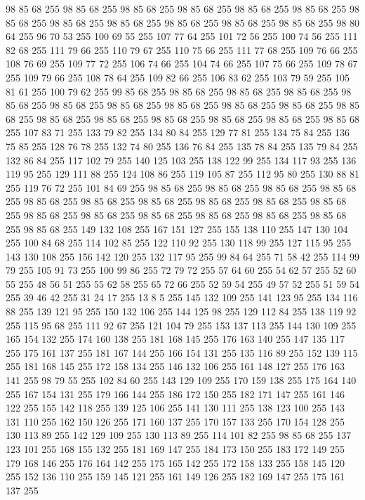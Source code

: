 98 85 68 255 98 85 68 255 98 85 68 255 98 85 68 255 98 85 68 255 98 85 68 255 98 85 68 255 98 85 68 255 98 85 68 255 98 85 68 255 98 85 68 255 98 85 68 255 98 80 64 255 96 70 53 255 100 69 55 255 107 77 64 255 101 72 56 255 100 74 56 255 111 82 68 255 111 79 66 255 110 79 67 255 110 75 66 255 111 77 68 255 109 76 66 255 108 76 69 255 109 77 72 255 106 74 66 255 104 74 66 255 107 75 66 255 109 78 67 255 109 79 66 255 108 78 64 255 109 82 66 255 106 83 62 255 103 79 59 255 105 81 61 255 100 79 62 255 99 85 68 255 98 85 68 255 98 85 68 255 98 85 68 255 98 85 68 255 98 85 68 255 98 85 68 255 98 85 68 255 98 85 68 255 98 85 68 255 98 85 68 255 98 85 68 255 98 85 68 255 98 85 68 255 98 85 68 255 98 85 68 255 98 85 68 255 107 83 71 255 133 79 82 255 134 80 84 255 129 77 81 255 134 75 84 255 136 75 85 255 128 76 78 255 132 74 80 255 136 76 84 255 135 78 84 255
135 79 84 255 132 86 84 255 117 102 79 255 140 125 103 255 138 122 99 255 134 117 93 255 136 119 95 255 129 111 88 255 124 108 86 255 119 105 87 255 112 95 80 255 130 88 81 255 119 76 72 255 101 84 69 255 98 85 68 255 98 85 68 255 98 85 68 255 98 85 68 255 98 85 68 255 98 85 68 255 98 85 68 255 98 85 68 255 98 85 68 255 98 85 68 255 98 85 68 255 98 85 68 255 98 85 68 255 98 85 68 255 98 85 68 255 98 85 68 255 98 85 68 255 149 132 108 255 167 151 127 255 155 138 110 255 147 130 104 255 100 84 68 255 114 102 85 255 122 110 92 255 130 118 99 255 127 115 95 255 143 130 108 255 156 142 120 255 132 117 95 255 99 84 64 255 71 58 42 255 114 99 79 255 105 91 73 255 100 99 86 255 72 79 72 255 57 64 60 255 54 62 57 255 52 60 55 255 48 56 51 255 55 62 58 255 65 72 66 255 52 59 54 255 49 57 52 255 51 59 54 255 39 46 42 255 31 24 17 255 13 8 5 255 145 132 109 255 141 123 95 255 134 116 88 255
139 121 95 255 150 132 106 255 144 125 98 255 129 112 84 255 138 119 92 255 115 95 68 255 111 92 67 255 121 104 79 255 153 137 113 255 144 130 109 255 165 154 132 255 174 160 138 255 181 168 145 255 176 163 140 255 147 135 117 255 175 161 137 255 181 167 144 255 166 154 131 255 135 116 89 255 152 139 115 255 181 168 145 255 172 158 134 255 146 132 106 255 161 148 127 255 176 163 141 255 98 79 55 255 102 84 60 255 143 129 109 255 170 159 138 255 175 164 140 255 167 154 131 255 179 166 144 255 186 172 150 255 182 171 147 255 161 146 122 255 155 142 118 255 139 125 106 255 141 130 111 255 138 123 100 255 143 131 110 255 162 150 126 255 171 160 137 255 170 157 133 255 170 154 128 255 130 113 89 255 142 129 109 255 130 113 89 255 114 101 82 255 98 85 68 255 137 123 101 255 168 155 132 255 181 169 147 255 184 173 150 255 183 172 149 255 179 168 146 255 176 164 142 255 175 165 142 255 172 158 133 255 158 145 120 255 152 136 110 255 159 145 121 255 161 149 126 255 182 169 147 255 175 161 137 255
